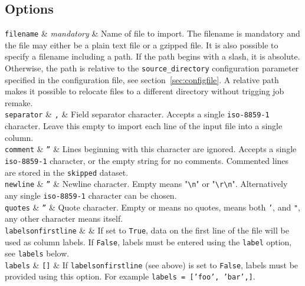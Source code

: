 \subsection{Options}

\starttable
  \RP \texttt{filename} & \emph{mandatory} & Name of file to import.  The
  filename is mandatory and the file may either be a plain text file
  or a gzipped file.  It is also possible to specify a filename
  including a path.  If the path begins with a slash, it is absolute.
  Otherwise, the path is relative to the \texttt{source\_directory}
  configuration parameter specified in the configuration
  file, see section~\ref{sec:configfile}.  A relative path makes it
  possible to relocate files to a different directory without trigging
  job remake.\\[1ex]

 \RP \texttt{separator} & \texttt{,} & Field separator character.  Accepts a
 single \texttt{iso-8859-1} character.  Leave this empty to import
 each line of the input file into a single column.  \\[1ex]

 \RP \texttt{comment} & \texttt{''} & Lines beginning with this
 character are ignored.  Accepts a single \texttt{iso-8859-1}
 character, or the empty string for no comments. Commented lines are
 stored in the \texttt{skipped} dataset.\\[1ex]

\RP \texttt{newline} & \texttt{''} & Newline character.  Empty means
"\texttt{\textbackslash{}n}" or "\texttt{\textbackslash{}r\textbackslash{}n}".
Alternatively any single \texttt{iso-8859-1} character can be chosen.\\[1ex]

\RP \texttt{quotes} & \texttt{''} & Quote character.  Empty or \pyFalse means no
quotes, \pyTrue means both \texttt{'}, and \texttt{"}, any other
character means itself. \\[1ex]

\RP \texttt{labelsonfirstline} & \pyTrue & If set to
\texttt{True}, data on the first line of the file will
be used as column labels.  If \texttt{False}, labels must
be entered using the \texttt{label} option, see \texttt{labels}
below.\\[1ex]

\RP \texttt{labels} & \texttt{[]} & If \texttt{labelsonfirstline} (see
above) is set to \texttt{False}, labels must be provided
using this option.  For example \texttt{labels = ['foo',
'bar',]}.\\[1ex]

